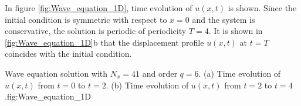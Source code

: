      
In figure \ref{fig:Wave_equation_1D}, time evolution of $ u(x,t) $ is shown. Since the initial condition is symmetric with respect to $ x=0$ and the system is conservative, the solution is periodic of periodicity $ T=4$. It is shown in \ref{fig:Wave_equation_1D}b that the displacement profile $ u(x,t) $ at $ t= T $ coincides with the initial condition.   
   
\twographs
{}
{}
{Wave equation solution with $N_x = 41$ and order $q=6$. (a) Time evolution of $u(x,t)$ from $t=0$ to $t=2$. 
(b) Time evolution of $u(x,t)$ from $t=2$ to $t=4$.}{fig:Wave_equation_1D}
    

      
\newpage 
